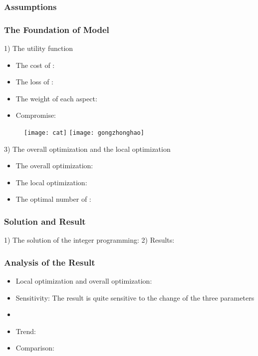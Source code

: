 \documentclass{apmcmthesis}
\begin{document}
\subsubsection{Assumptions}


\subsubsection{The Foundation of Model}
1) The utility function

\begin{itemize}
  \item The cost of       :
  \item The loss of       :
  \item The weight of each aspect:
  \item Compromise:
\end{itemize}



\begin{figure}[!ht]
  \centering
  \texttt{[image: cat]}  \quad  \texttt{[image: gongzhonghao]}
  \caption{}\label{cat1}
\end{figure}



3) The overall optimization and the local optimization

\begin{itemize}
  \item The overall optimization:
  \item The local optimization:
  \item The optimal number of        :
\end{itemize}



\subsubsection{Solution and Result}
1) The solution of the integer programming:
2) Results:
\subsubsection{Analysis of the Result}
\begin{itemize}
  \item Local optimization and overall optimization:
  \item Sensitivity: The result is quite sensitive to the change of the three parameters
  \item
  \item Trend:
  \item Comparison:
\end{itemize}
\end{document}
